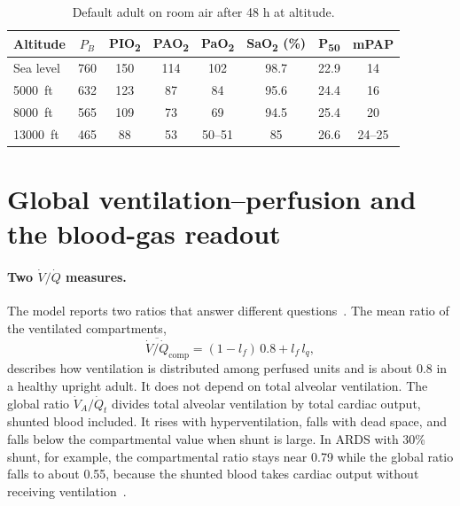 \begin{table}[htbp]\centering\small
\caption{Default adult on room air after 48 h at altitude.}
\label{tab:gx-alt}
\begin{tabular}{@{}lccccccc@{}}\toprule
Altitude & $P_B$ & PIO\textsubscript{2} & PAO\textsubscript{2} & PaO\textsubscript{2} & SaO\textsubscript{2} (\%) & P\textsubscript{50} & mPAP\\\midrule
Sea level & 760 & 150 & 114 & 102 & 98.7 & 22.9 & 14\\
\SI{5000}{ft} & 632 & 123 & 87 & 84 & 95.6 & 24.4 & 16\\
\SI{8000}{ft} & 565 & 109 & 73 & 69 & 94.5 & 25.4 & 20\\
\SI{13000}{ft} & 465 & 88 & 53 & 50--51 & 85 & 26.6 & 24--25\\\bottomrule
\end{tabular}
\end{table}

\section{Global ventilation--perfusion and the blood-gas readout}
\label{sec:gx-global}
\paragraph{Two $\dot V/\dot Q$ measures.} The model reports two ratios that answer different questions~\citep{west1964,west2021}. The mean ratio of the ventilated compartments,
\begin{equation}
\overline{\dot V/\dot Q}_{\mathrm{comp}}=(1-l_f)\,0.8+l_f\,l_q,
\label{eq:gx-vqcomp}
\end{equation}
describes how ventilation is distributed among perfused units and is about 0.8 in a healthy upright adult. It does not depend on total alveolar ventilation. The global ratio $\dot V_A/\dot Q_t$ divides total alveolar ventilation by total cardiac output, shunted blood included. It rises with hyperventilation, falls with dead space, and falls below the compartmental value when shunt is large. In ARDS with 30\% shunt, for example, the compartmental ratio stays near 0.79 while the global ratio falls to about 0.55, because the shunted blood takes cardiac output without receiving ventilation~\citep{rahn1955,lumb2020}.

